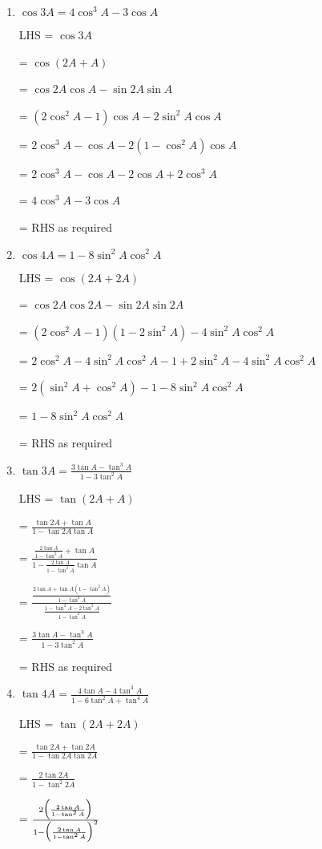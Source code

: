 \documentclass[../main.tex]{subfiles}
\begin{document}
\begin{enumerate}
    \item $\cos{3A}=4\cos^3{A}-3\cos{A}$
    
    LHS = $\cos{3A}$

    = $\cos{(2A+A)}$

    = $\cos{2A}\cos{A}-\sin{2A}\sin{A}$

    = $(2\cos^2{A}-1)\cos{A}-2\sin^2{A}\cos{A}$

    = $2\cos^3{A}-\cos{A}-2(1-\cos^2{A})\cos{A}$

    = $2\cos^3{A}-\cos{A}-2\cos{A}+2\cos^3{A}$

    = $4\cos^3{A}-3\cos{A}$

    = RHS as required

    \item $\cos{4A}=1-8\sin^2{A}\cos^2{A}$
    
    LHS = $\cos{(2A+2A)}$

    = $\cos{2A}\cos{2A}-\sin{2A}\sin{2A}$

    = $(2\cos^2{A}-1)(1-2\sin^2{A})-4\sin^2{A}\cos^2{A}$

    = $2\cos^2{A}-4\sin^2{A}\cos^2{A}-1+2\sin^2{A}-4\sin^2{A}\cos^2{A}$

    = $2(\sin^2{A}+\cos^2{A})-1-8\sin^2{A}\cos^2{A}$

    = $1-8\sin^2{A}\cos^2{A}$

    = RHS as required

    \item $\tan{3A}=\frac{3\tan{A}-\tan^3{A}}{1-3\tan^2{A}}$
    
    LHS = $\tan{(2A+A)}$

    = $\frac{\tan{2A}+\tan{A}}{1-\tan{2A}\tan{A}}$

    = $\frac{\frac{2\tan{A}}{1-\tan^2{A}}+\tan{A}}{1-\frac{2\tan{A}}{1-\tan^2{A}}\tan{A}}$

    = $\frac{\frac{2\tan{A}+\tan{A}(1-\tan^2{A})}{1-\tan^2{A}}}{\frac{1-\tan^2{A}-2\tan^2{A}}{1-\tan^2{A}}}$

    = $\frac{3\tan{A}-\tan^3{A}}{1-3\tan^2{A}}$

    = RHS as required

    \item $\tan{4A}=\frac{4\tan{A}-4\tan^3{A}}{1-6\tan^2{A}+\tan^4{A}}$
    
    LHS = $\tan{(2A+2A)}$

    = $\frac{\tan{2A}+\tan{2A}}{1-\tan{2A}\tan{2A}}$

    = $\frac{2\tan{2A}}{1-\tan^2{2A}}$

    = $\frac{2\Bigl(\frac{2\tan{A}}{1-\tan^2{A}}\Bigr)}{1-\Bigl(\frac{2\tan{A}}{1-\tan^2{A}}\Bigr)^2}$


\end{enumerate}
\end{document}
